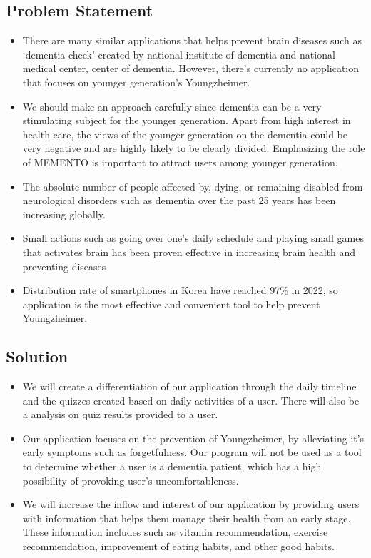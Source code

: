 \documentclass[conference]{IEEEtran}
\begin{document}
\subsection{Problem Statement}\label{SCM}
\begin{itemize}
\item There are many similar applications that helps prevent brain diseases such as ‘dementia check’ created by national institute of dementia and national medical center, center of dementia. However, there’s currently no application that focuses on younger generation’s Youngzheimer.\\
\item We should make an approach carefully since dementia can be a very stimulating subject for the younger generation. Apart from high interest in health care, the views of the younger generation on the  dementia could be very negative and are highly likely to be clearly divided. Emphasizing the role of MEMENTO is important to attract users among younger generation.\\
\item The absolute number of people affected by, dying, or remaining disabled from neurological disorders such as dementia over the past 25 years has been increasing globally.\\
\item Small actions such as going over one’s daily schedule and playing small games that activates brain has been proven effective in increasing brain health and preventing diseases\\
\item Distribution rate of smartphones in Korea have reached 97\% in 2022, so application is the most effective and convenient tool to help prevent Youngzheimer.\\
\end{itemize}

\subsection{Solution}\label{SCM}
\begin{itemize}
\item We will create a differentiation of our application through the daily timeline and the quizzes created based on daily activities of a user. There will also be a analysis on quiz results provided to a user.\\
\item Our application focuses on the prevention of Youngzheimer, by alleviating it’s early symptoms such as forgetfulness. Our program will not be used as a tool to determine whether a user is a dementia patient, which has a high possibility of provoking user’s uncomfortableness.\\
\item We will increase the inflow and interest of our application by providing users with information that helps them manage their health from an early stage. These information includes such as vitamin recommendation, exercise recommendation, improvement of eating habits, and other good habits.\\
\end{itemize}
\end{document}
